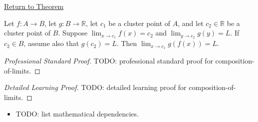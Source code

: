 \newpage
{}
\label{prf:composition-of-limits}

\begin{remark*}[Return]
\hyperref[thm:composition-of-limits]{Return to Theorem}
\end{remark*}

\begin{theorem*}
Let $f : A \to B$, let $g : B \to \mathbb{R}$, let $c_1$ be a
cluster point of $A$, and let $c_2 \in \mathbb{R}$ be a cluster
point of $B$. Suppose $\lim_{x\to c_1}f(x)=c_2$ and
$\lim_{y\to c_2}g(y)=L$. If $c_2 \in B$, assume also that
$g(c_2) = L$. Then $\lim_{x\to c_1}g(f(x))=L$.

\smallskip\noindent
\end{theorem*}

\begin{proof}[Professional Standard Proof]
\LRAProofBodyStart
TODO: professional standard proof for composition-of-limits.
\end{proof}

\begin{proof}[Detailed Learning Proof]
\LRAProofBodyStart
TODO: detailed learning proof for composition-of-limits.
\end{proof}

\begin{remark*}
\end{remark*}

\begin{dependencies}
\begin{itemize}
  \item TODO: list mathematical dependencies.
\end{itemize}
\end{dependencies}

\clearpage
